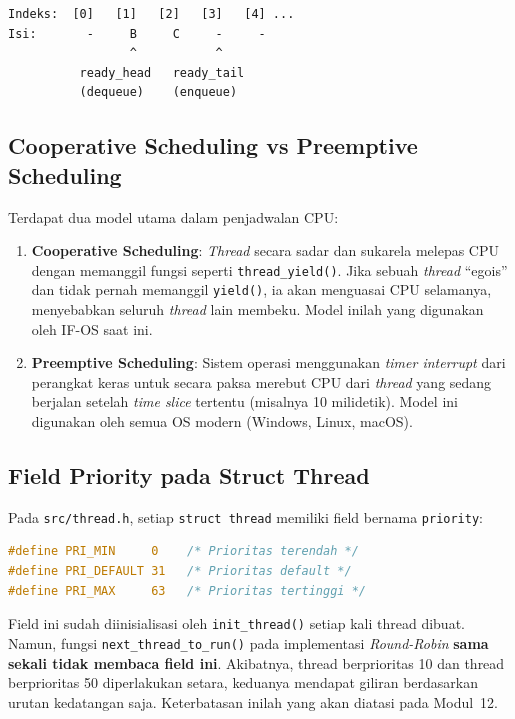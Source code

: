 \begin{lstlisting}[caption={Ilustrasi circular array ready\_queue}]
Indeks:  [0]   [1]   [2]   [3]   [4] ...
Isi:       -     B     C     -     -
                 ^           ^
          ready_head   ready_tail
          (dequeue)    (enqueue)
\end{lstlisting}

\subsection{Cooperative Scheduling vs Preemptive Scheduling}
Terdapat dua model utama dalam penjadwalan CPU:

\begin{enumerate}
	\item \textbf{Cooperative Scheduling}: \textit{Thread} secara sadar dan sukarela melepas CPU dengan memanggil fungsi seperti \texttt{thread\_yield()}. Jika sebuah \textit{thread} ``egois'' dan tidak pernah memanggil \texttt{yield()}, ia akan menguasai CPU selamanya, menyebabkan seluruh \textit{thread} lain membeku. Model inilah yang digunakan oleh IF-OS saat ini.

	\item \textbf{Preemptive Scheduling}: Sistem operasi menggunakan \textit{timer interrupt} dari perangkat keras untuk secara paksa merebut CPU dari \textit{thread} yang sedang berjalan setelah \textit{time slice} tertentu (misalnya 10 milidetik). Model ini digunakan oleh semua OS modern (Windows, Linux, macOS).
\end{enumerate}

\subsection{Field Priority pada Struct Thread}
Pada \texttt{src/thread.h}, setiap \texttt{struct thread} memiliki field bernama \texttt{priority}:

\begin{lstlisting}[language=C, caption={Definisi konstanta prioritas pada thread.h}]
#define PRI_MIN     0    /* Prioritas terendah */
#define PRI_DEFAULT 31   /* Prioritas default */
#define PRI_MAX     63   /* Prioritas tertinggi */
\end{lstlisting}

Field ini sudah diinisialisasi oleh \texttt{init\_thread()} setiap kali thread dibuat. Namun, fungsi \texttt{next\_thread\_to\_run()} pada implementasi \textit{Round-Robin} \textbf{sama sekali tidak membaca field ini}. Akibatnya, thread berprioritas 10 dan thread berprioritas 50 diperlakukan setara, keduanya mendapat giliran berdasarkan urutan kedatangan saja. Keterbatasan inilah yang akan diatasi pada Modul~12.

